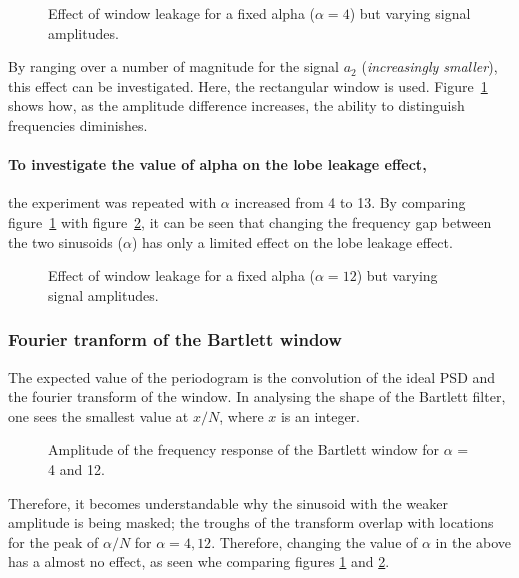 \documentclass[main.tex]{subfiles}
\begin{document}
\begin{figure}[H]
	\centering 
	\resizebox{\textwidth}{!}{}
	\caption{Effect of window leakage for a fixed alpha ($\alpha=4$) but varying signal amplitudes.}
	\label{fig:q1_3_d-4}
\end{figure}

By ranging over a number of magnitude for the signal $a_2$ (\textit{increasingly smaller}), this effect can be investigated. Here, the rectangular window is used. Figure~\ref{fig:q1_3_d-4} shows how, as the amplitude difference increases, the ability to distinguish frequencies diminishes.


\paragraph{To investigate the value of alpha on the lobe leakage effect,} the experiment was repeated with $\alpha$ increased from 4 to 13. By comparing figure~\ref{fig:q1_3_d-4} with figure~\ref{fig:q1_3_d-12}, it can be seen that changing the frequency gap between the two sinusoids ($\alpha$) has only a limited effect on the lobe leakage effect. 

\begin{figure}[H]
	\centering 
	\resizebox{\textwidth}{!}{}
	\caption{Effect of window leakage for a fixed alpha ($\alpha=12$) but varying signal amplitudes.}
	\label{fig:q1_3_d-12}
\end{figure}



\subsubsection{Fourier tranform of the Bartlett window}


The expected value of the periodogram is the convolution of the ideal PSD and the fourier transform of the window. In analysing the shape of the Bartlett filter, one sees the smallest value at $x/N$, where $x$ is an integer.


\begin{figure}[H]
	\centering 
	\resizebox{\textwidth}{!}{}
	\caption{Amplitude of the frequency response of the Bartlett window for $\alpha$ = 4 and 12.}
	\label{fig:q1_3_e}
\end{figure}


Therefore, it becomes understandable why the sinusoid with the weaker amplitude is being masked; the troughs of the transform overlap with locations for the peak of $\alpha/N$ for $\alpha = 4, 12$. Therefore, changing the value of $\alpha$ in the above has a almost no effect, as seen whe comparing figures \ref{fig:q1_3_d-4} and \ref{fig:q1_3_d-12}.
\end{document}
